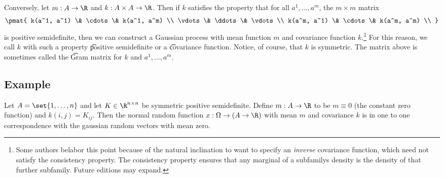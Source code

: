Conversely, let $m: A \to \R $ and $k: A \times A \to \R $.
Then if $k$ satisfies the property that for all $a^1, \dots , a^m$, the $m \times m$ matrix
      \[
\pmat{
k(a^1, a^1) \& \cdots \& k(a^1, a^m) \\
\vdots \& \ddots \& \vdots \\
k(a^m, a^1) \& \cdots \& k(a^m, a^m) \\
}
      \]
is positive semidefinite, then we can construct a Gaussian process with mean function $m$ and covariance function $k$.\footnote{Some authors belabor this point because of the natural inclination to want to specify an \textit{inverse} covariance function, which need not satisfy the consistency property. The consistency property ensures that any marginal of a subfamilys density is the density of that further subfamily. Future editions may expand.}
For this reason, we call $k$ with such a property \t{positive semidefinite} or a \t{covariance function}.
Notice, of course, that $k$ is symmetric.
The matrix above is sometimes called the \t{Gram matrix} for $k$ and $a^1, \dots , a^m$.

  \subsection*{Example}

Let $A = \set{1, \dots , n}$ and let $K \in \R ^{n \times n}$ be symmetric positive semidefinite.
Define $m: A \to \R $ to be $m \equiv 0$ (the constant zero function) and $k(i, j) = K_{ij}$.
Then the normal random function $x: \Omega  \to (A \to \R )$ with mean $m$ and covariance $k$ is in one to one correspondence with the gaussian random vectors with mean zero.


